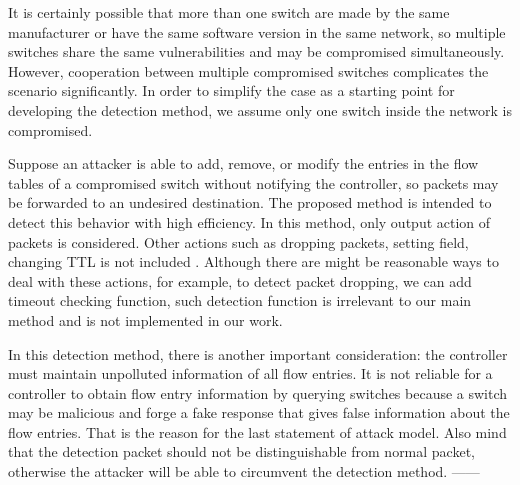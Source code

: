 It is certainly possible that more than one switch are made by the same manufacturer or have the same software version in the same network, so multiple switches share the same vulnerabilities and may be compromised simultaneously. However, cooperation between multiple compromised switches complicates the scenario significantly. In order to simplify the case as a starting point for developing the detection method, we assume only one switch inside the network is compromised.

Suppose an attacker is able to add, remove, or modify the entries in the flow tables of a compromised
switch without notifying the controller, so packets may be forwarded to an undesired destination. The proposed method is intended to detect this behavior with high efficiency. In this method, only output action of packets is considered. Other actions such as dropping packets, setting field, changing TTL is not included \sout{}. Although there are might be reasonable ways to deal with these actions, for example, to detect packet dropping, we can add timeout checking function, such detection function is irrelevant to our main method and is not implemented in our work.

In this detection method, there is another important consideration: the controller must maintain unpolluted information of all flow entries. It is not reliable for a controller to obtain flow entry information by querying switches because a switch may be malicious and forge a fake response that gives false information about the flow entries. That is the reason for the last statement of attack model. Also mind that the detection packet should not be distinguishable from normal packet, otherwise the attacker will be able to circumvent the detection method. 
------

 